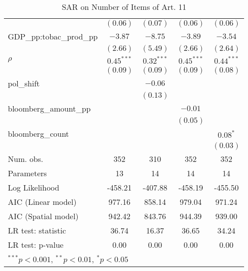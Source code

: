 \begin{table}[!h]
\begin{center}
\begin{tabular}{l c c c c }
                         & $(0.06)$     & $(0.07)$     & $(0.06)$     & $(0.06)$     \\
GDP\_pp:tobac\_prod\_pp  & $-3.87$      & $-8.75$      & $-3.89$      & $-3.54$      \\
                         & $(2.66)$     & $(5.49)$     & $(2.66)$     & $(2.64)$     \\
$\rho$                   & $0.45^{***}$ & $0.32^{***}$ & $0.45^{***}$ & $0.44^{***}$ \\
                         & $(0.09)$     & $(0.09)$     & $(0.09)$     & $(0.08)$     \\
pol\_shift               &              & $-0.06$      &              &              \\
                         &              & $(0.13)$     &              &              \\
bloomberg\_amount\_pp    &              &              & $-0.01$      &              \\
                         &              &              & $(0.05)$     &              \\
bloomberg\_count         &              &              &              & $0.08^{*}$   \\
                         &              &              &              & $(0.03)$     \\
\midrule
Num. obs.                & 352          & 310          & 352          & 352          \\
Parameters               & 13           & 14           & 14           & 14           \\
Log Likelihood           & -458.21      & -407.88      & -458.19      & -455.50      \\
AIC (Linear model)       & 977.16       & 858.14       & 979.04       & 971.24       \\
AIC (Spatial model)      & 942.42       & 843.76       & 944.39       & 939.00       \\
LR test: statistic       & 36.74        & 16.37        & 36.65        & 34.24        \\
LR test: p-value         & 0.00         & 0.00         & 0.00         & 0.00         \\
\bottomrule
\multicolumn{5}{l}{\scriptsize{$^{***}p<0.001$, $^{**}p<0.01$, $^*p<0.05$}}
\end{tabular}
\caption{SAR on Number of Items of Art. 11}
\label{table:coefficients}
\end{center}
\end{table}
